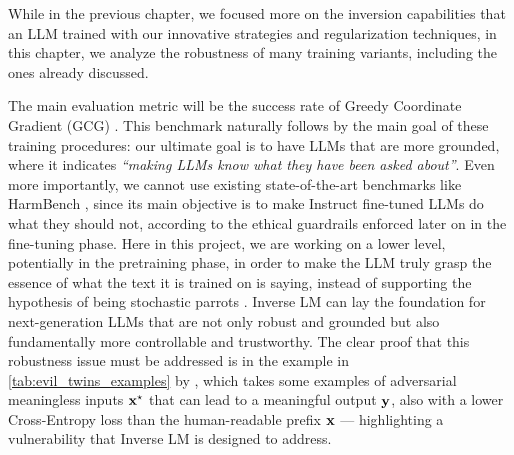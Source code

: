 \documentclass[../thesis.tex]{subfiles}
\begin{document}
While in the previous chapter, we focused more on the inversion capabilities that an LLM trained with our innovative strategies and regularization techniques,
in this chapter, we analyze the robustness of many training variants,
including the ones already discussed.

The main evaluation metric will be the success rate of Greedy Coordinate Gradient (GCG) \citep{gcg-carlini}.
This benchmark naturally follows by the main goal of these training procedures:
our ultimate goal is to have LLMs that are more grounded, where it indicates \emph{``making LLMs know what they have been asked about''}.
Even more importantly, we cannot use existing state-of-the-art benchmarks like HarmBench \citep{mazeika2024harmbenchstandardizedevaluationframework}, since its main objective is to make Instruct fine-tuned LLMs do what they should not, according to the ethical guardrails enforced later on in the fine-tuning phase.
Here in this project, we are working on a lower level, potentially in the pretraining phase, in order to make the LLM truly grasp the essence of what the text it is trained on is saying, instead of supporting the hypothesis of being stochastic parrots \citep{bender2021dangersstochasticparrots}.
Inverse LM can lay the foundation for next-generation LLMs that are not only robust
and grounded but also fundamentally more controllable and trustworthy.
The clear proof that this robustness issue must be addressed is in the example in \cref{tab:evil_twins_examples} by \citep{evaluatinggcgpgd-hwp}, which takes some examples of adversarial meaningless inputs $\mathbf{x}^{\star}$ that can lead to a meaningful output $\mathbf{y}$, also with a lower Cross-Entropy loss than the human-readable prefix $\mathbf{x}$ --- highlighting a vulnerability that Inverse LM is designed to address.
\end{document}

